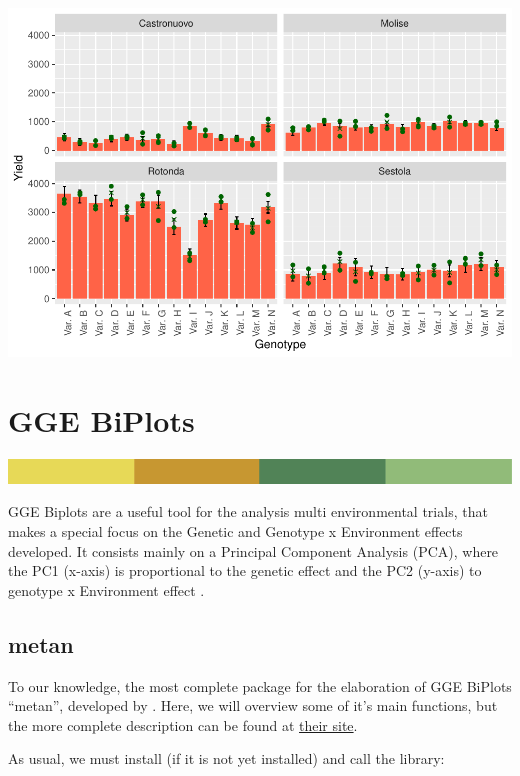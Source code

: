 \documentclass[
]{book}
\begin{document}
\includegraphics{PPB-Toolkit-for-R-and-R-Studio_files/figure-latex/myplotafterloopcompare-1.pdf}

\hypertarget{gge-biplots}{%
\chapter{GGE BiPlots}\label{gge-biplots}}

\includegraphics{rsrstrip.png}

GGE Biplots are a useful tool for the analysis multi environmental trials, that makes a special focus on the Genetic and Genotype x Environment effects developed. It consists mainly on a Principal Component Analysis (PCA), where the PC1 (x-axis) is proportional to the genetic effect and the PC2 (y-axis) to genotype x Environment effect \citet{yan2000cultivar}.

\hypertarget{metan-1}{%
\section{metan}\label{metan-1}}

To our knowledge, the most complete package for the elaboration of GGE BiPlots ``metan'', developed by \citet{Olivoto2020}. Here, we will overview some of it's main functions, but the more complete description can be found at \href{https://tiagoolivoto.github.io/metan/articles/vignettes_gge.html}{their site}.

As usual, we must install (if it is not yet installed) and call the library:
\end{document}
